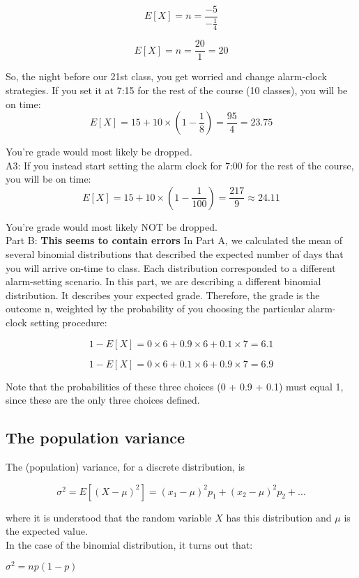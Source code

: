 \documentclass[12pt,a4paper]{article}
\theoremstyle{regla}
\theoremstyle{remark}
\theoremstyle{definition}
\theoremstyle{nonumberbreak}
\begin{document}
\begin{xmpl}
$$E[X] = n = \frac{- 5}{- \frac{1}{4}} $$

$$E[X] = n = \frac{20}{1} = 20 $$

So, the night before our 21st class, you get worried and change alarm-clock strategies. If you set it at 7:15 for the rest of the course (10 classes), you will be on time:
$$E[X] = 15 + 10 \times (1 - \frac{1}{8}) = \frac {95}{4} = 23.75 $$

You're grade would most likely be dropped.\\

A3: If you instead start setting the alarm clock for 7:00 for the rest of the course, you will be on time:
$$E[X] = 15 + 10 \times (1 - \frac{1}{100}) =\frac{217}{9} \approx 24.11 $$

You're grade would most likely NOT be dropped.\\

Part B: \textbf{This seems to contain errors} In Part A, we calculated the mean of several binomial distributions that described the expected number of days that you will arrive on-time to class. Each distribution corresponded to a different alarm-setting scenario. In this part, we are describing a different binomial distribution. It describes your expected grade. Therefore, the grade is the outcome n, weighted by the probability of you choosing the particular alarm-clock setting procedure:

$$1 - E[X] = 0 \times 6 + 0.9 \times 6 + 0.1 \times 7 = 6.1 $$

$$1 - E[X] = 0 \times 6 + 0.1 \times 6 + 0.9 \times 7 = 6.9 $$

Note that the probabilities of these three choices (0 + 0.9 + 0.1) must equal 1, since these are the only three choices defined.

\end{xmpl}

 



\subsection{The population variance}
\begin{fbox}
\begin{minipage}{0.97\textwidth}
The (population) variance, for a discrete distribution, is

$$\sigma^2 = E\left[ \left ( X-\mu \right ) ^2 \right ] = (x_1 - \mu)^2 p_1 + (x_2 - \mu)^2 p_2 + ...  $$

where it is understood that the random variable $X$ has this distribution and $\mu$ is the expected value.\\

In the case of the binomial distribution, it turns out that:

$\sigma^2 = np(1 - p)$

\end{minipage}
\end{fbox}
\end{document}
